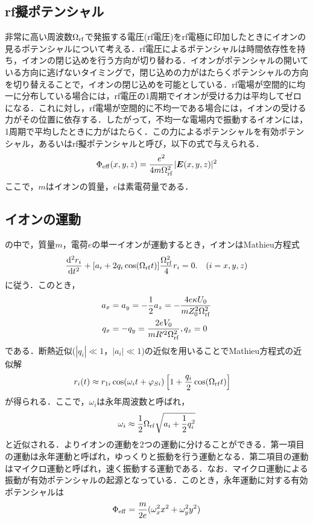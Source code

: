 \subsection{rf擬ポテンシャル\cite{URABE}}
非常に高い周波数$\Omega_{\rm rf}$で発振する電圧(rf電圧)をrf電極に印加したときにイオンの見るポテンシャルについて考える．rf電圧によるポテンシャルは時間依存性を持ち，イオンの閉じ込めを行う方向が切り替わる．イオンがポテンシャルの開いている方向に逃げないタイミングで，閉じ込めの力がはたらくポテンシャルの方向を切り替えることで，イオンの閉じ込めを可能としている．rf電場が空間的に均一に分布している場合には，rf電圧の1周期でイオンが受ける力は平均してゼロになる．これに対し，rf電場が空間的に不均一である場合には，イオンの受ける力がその位置に依存する．したがって，不均一な電場内で振動するイオンには，1周期で平均したときに力がはたらく．この力によるポテンシャルを有効ポテンシャル，あるいはrf擬ポテンシャルと呼び，以下の式で与えられる．
\large
\begin{align}\label{eq:eff_pot}
	\Phi_{\rm eff}(x,y,z) = \frac{e^2}{4m\Omega_{\rm rf}^2}|\bm{E}(x,y,z)|^2
\end{align}
\normalsize
ここで，$m$はイオンの質量，$e$は素電荷量である．
\subsection{イオンの運動\cite{Berkeland_1998}\cite{URABE}}
の中で，質量$m$，電荷$e$の単一イオンが運動するとき，イオンはMathieu方程式
\large
\begin{align}
	\frac{{\rm d^2}r_i}{{\rm d}t^2} + [a_i + 2q_i \cos (\Omega_{\rm rf} t)]\frac{\Omega_{\rm rf}^2}{4}r_i = 0. \quad (i = x,y,z)
\end{align}
\normalsize
に従う．このとき，
\large
\begin{align}
a_x &= a_y = -\frac{1}{2}a_z = -\frac{4 e \kappa U_0}{mZ^2_0 \Omega_{\rm rf}^2} \\
q_x &= -q_y = \frac{2eV_0}{mR^{\prime 2}\Omega_{\rm rf}^2},  q_z = 0
\end{align}
\normalsize
である．断熱近似($|q_i| \ll 1$，$|a_i| \ll 1$)の近似を用いることでMathieu方程式の近似解
\large
\begin{align}\label{eq:kinjikai}
r_i(t) &\approx r_{1i}\cos(\omega_i t + \varphi_{Si}) \left[ 1 + \frac{q_i}{2}\cos(\Omega_{\rm rf} t)\right] 
\end{align}
\normalsize
が得られる．ここで，$\omega_i$は永年周波数と呼ばれ，
\large
\begin{align}
\omega_i \approx \frac{1}{2}\Omega_{\rm rf}\sqrt{a_i + \frac{1}{2}q^2_i}
\end{align}
\normalsize
と近似される．よりイオンの運動を2つの運動に分けることができる．第一項目の運動は永年運動と呼ばれ，ゆっくりと振動を行う運動となる．第二項目の運動はマイクロ運動と呼ばれ，速く振動する運動である．なお．マイクロ運動による振動が有効ポテンシャルの起源となっている．このとき，永年運動に対する有効ポテンシャルは
\large
\begin{align}
\Phi_{\rm eff} = \frac{m}{2e}(\omega_x^2 x^2 + \omega_y^2 y^2)
\end{align}
\normalsize

